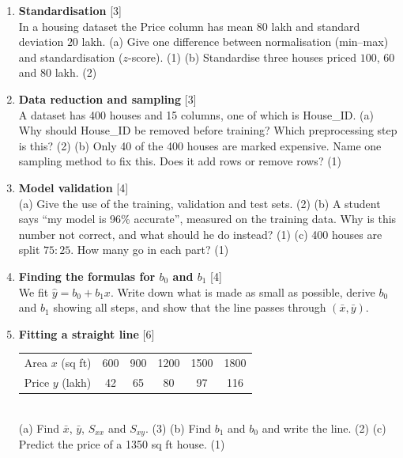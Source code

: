 \documentclass[11pt]{article}
\begin{document}
\begin{enumerate}[label=\textbf{Q\arabic*.}]
  \item \textbf{Standardisation} \hfill [3]\\
    In a housing dataset the Price column has mean $80$ lakh and standard
    deviation $20$ lakh.
    (a) Give one difference between normalisation (min--max) and
    standardisation ($z$-score). (1)
    (b) Standardise three houses priced $100$, $60$ and $80$ lakh. (2)
  \item \textbf{Data reduction and sampling} \hfill [3]\\
    A dataset has 400 houses and 15 columns, one of which is House\_ID.
    (a) Why should House\_ID be removed before training? Which preprocessing
    step is this? (2)
    (b) Only 40 of the 400 houses are marked expensive. Name one sampling
    method to fix this. Does it add rows or remove rows? (1)
  \item \textbf{Model validation} \hfill [4]\\
    (a) Give the use of the training, validation and test sets. (2)
    (b) A student says ``my model is 96\% accurate'', measured on the
    training data. Why is this number not correct, and what should he do
    instead? (1)
    (c) 400 houses are split $75{:}25$. How many go in each part? (1)
  \item \textbf{Finding the formulas for $b_0$ and $b_1$} \hfill [4]\\
    We fit $\hat y = b_0 + b_1x$. Write down what is made as small as
    possible, derive $b_0$ and $b_1$ showing all steps, and show that the line
    passes through $(\bar x, \bar y)$.
  \item \textbf{Fitting a straight line} \hfill [6]\\
    \begin{tabular}{@{}lccccc@{}}
    Area $x$ (sq ft) & 600 & 900 & 1200 & 1500 & 1800\\
    Price $y$ (lakh) & 42 & 65 & 80 & 97 & 116
    \end{tabular}\\
    (a) Find $\bar x$, $\bar y$, $S_{xx}$ and $S_{xy}$. (3)
    (b) Find $b_1$ and $b_0$ and write the line. (2)
    (c) Predict the price of a 1350 sq ft house. (1)
\end{enumerate}
\end{document}
